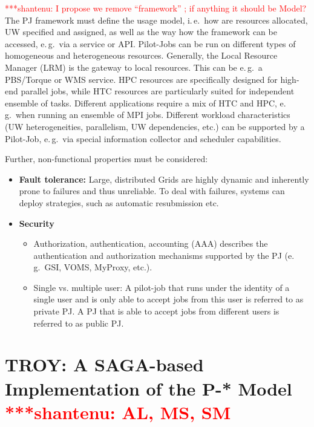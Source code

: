 \documentclass[conference,final]{IEEEtran}
\newcommand{\jhanote}[1]{ {\textcolor{red} { ***shantenu: #1 }}}
\newcommand{\jhanote}[1]{}
\begin{document}

\jhanote{I propose we remove ``framework'' ; if anything it should be
  Model?} The PJ framework must define the usage model, i.\,e.\ how are
resources allocated, UW specified and assigned, as well as the way how
the framework can be accessed, e.\,g.\ via a service or
API. Pilot-Jobs can be run on different types of homogeneous and
heterogeneous resources. Generally, the Local Resource Manager (LRM)
is the gateway to local resources. This can be e.\,g.\ a PBS/Torque or
WMS service. HPC resources are specifically designed for high-end
parallel jobs, while HTC resources are particularly suited for
independent ensemble of tasks. Different applications require a mix of
HTC and HPC, e.\,g.\ when running an ensemble of MPI jobs.  Different
workload characteristics (UW heterogeneities, parallelism, UW
dependencies, etc.) can be supported by a Pilot-Job, e.\,g.\ via
special information collector and scheduler capabilities.

Further, non-functional properties must be considered:
\begin{itemize}
		\item \textbf{Fault tolerance:} Large, distributed Grids are highly dynamic 
		and inherently prone to failures and thus unreliable. To deal with failures, 
		systems can deploy strategies, such as automatic resubmission etc.
		\item \textbf{Security}
		\begin{itemize}
	       \item Authorization, authentication, accounting (AAA) describes the 
	       authentication and authorization mechanisms supported by the PJ (e.\,g.\  
	       GSI, VOMS, MyProxy, etc.). 
		   \item Single vs. multiple user: A pilot-job that runs under the identity 
		   of a single user and is only able to accept jobs from this user is 
		   referred to as private PJ. A PJ that is able to accept jobs from 
		   different users is referred to as public PJ.
		\end{itemize}
\end{itemize}


\section{TROY: A SAGA-based Implementation of the P-* Model
  \jhanote{AL, MS, SM}}
\end{document}
